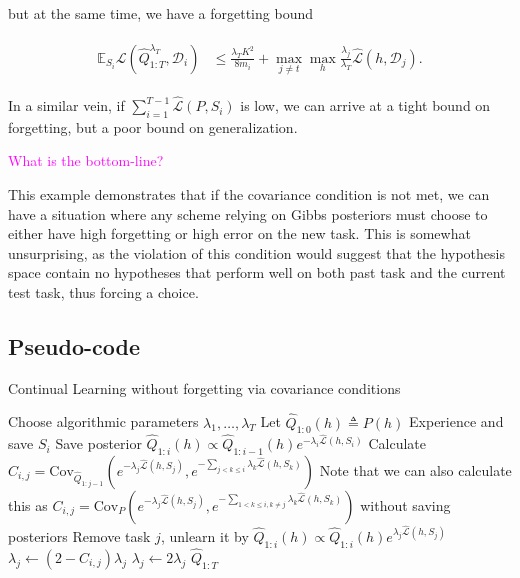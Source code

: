 \documentclass[letterpaper]{article}
\theoremstyle{definition}
\newcommand{\RM}[1]{{\textcolor{magenta}{#1}}}
\begin{document}
but at the same time, we have a forgetting bound 

\begin{align} 
\begin{split}
\mathbb{E}_{S_i}\mathcal{L}(\hat{Q}^{\lambda_T}_{1:T}, \mathcal{D}_i) &\leq \frac{\lambda_T K^2}{8m_i}+\max_{j\neq t}\max_h \frac{\lambda_j}{\lambda_T}\hat{\mathcal{L}}(h,\mathcal{D}_j).
\end{split}
\end{align}

In a similar vein, if $\sum_{i=1}^{T-1}\hat{\mathcal{L}}(P,S_i)$ is low, we can arrive at a tight bound on forgetting, but a poor bound on generalization. 

\RM{What is the bottom-line?}

This example demonstrates that if the covariance condition is not met, we can have a situation where any scheme relying on Gibbs posteriors must choose to either have high forgetting or high error on the new task. This is somewhat unsurprising, as the violation of this condition would suggest that the hypothesis space contain no hypotheses that perform well on both past task and the current test task, thus forcing a choice.
\fi

\subsection{Pseudo-code}

\begin{algorithm}[H]
	\caption{Continual Learning without forgetting via covariance conditions}
	\label{alg:naive-forgetting}
	\small
	\begin{algorithmic}[1]
		\State Choose algorithmic parameters $\lambda_1,\ldots, \lambda_T$
		\State Let $\hat{Q}_{1:0}(h) \triangleq P(h)$
		\State Experience and save $S_i$
            \State Save posterior $\hat{Q}_{1:i}(h)\propto \hat{Q}_{1:i-1}(h)e^{-\lambda_i \hat{\mathcal{L}}(h,S_i)}$
		\State Calculate $C_{i,j}=\textrm{Cov}_{\hat{Q}_{1:j-1}}(e^{-\lambda_j \hat{\mathcal{L}}(h,S_j)}, e^{-\sum_{j< k\leq i}\lambda_k \hat{\mathcal{L}}(h,S_k)})$
            \State \Comment Note that we can also calculate this as $C_{i,j}=\textrm{Cov}_{P}(e^{-\lambda_j \hat{\mathcal{L}}(h,S_j)}, e^{-\sum_{1< k\leq i,k\neq j}\lambda_k \hat{\mathcal{L}}(h,S_k)})$ without saving posteriors
             
                \State Remove task $j$, unlearn it by $\hat{Q}_{1:i}(h)\propto \hat{Q}_{1:i}(h)e^{\lambda_j \hat{\mathcal{L}}(h,S_j)}$
                 
                    \State $\lambda_j \leftarrow (2-C_{i,j})\lambda_j$ 
                \Else {}
                    \State $\lambda_j \leftarrow 2\lambda_j$
                \EndIf
		\EndFor 
		\EndFor
		\State \Return $\hat{Q}_{1:T}$
		\EndFunction
	\end{algorithmic}
\end{algorithm}
\end{document}
